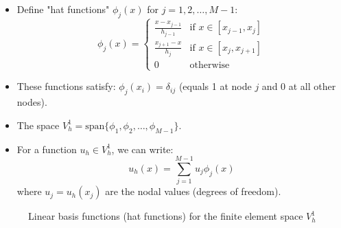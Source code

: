 \begin{itemize}
  \item Define "hat functions" $\phi_j(x)$ for $j = 1,2,\dots,M-1$:
        \[
          \phi_j(x) =
          \begin{cases}
            \frac{x - x_{j-1}}{h_{j-1}} & \text{if } x \in [x_{j-1}, x_j] \\
            \frac{x_{j+1} - x}{h_j}     & \text{if } x \in [x_j, x_{j+1}] \\
            0                           & \text{otherwise}
          \end{cases}
        \]
  \item These functions satisfy: $\phi_j(x_i) = \delta_{ij}$ (equals 1 at node $j$ and 0 at all other nodes).
  \item The space $V_h^1 = \text{span}\{\phi_1, \phi_2, \ldots, \phi_{M-1}\}$.
  \item For a function $u_h \in V_h^1$, we can write:
        \[
          u_h(x) = \sum_{j=1}^{M-1} u_j \phi_j(x)
        \]
        where $u_j = u_h(x_j)$ are the nodal values (degrees of freedom).
\end{itemize}

\begin{figure}[H]
  \centering
  \caption{Linear basis functions (hat functions) for the finite element space $V_h^1$}
\end{figure}

